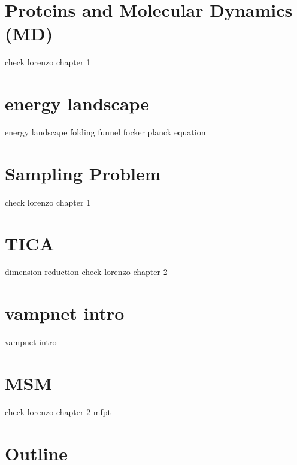 \section{Proteins and Molecular Dynamics (MD)}
\label{sec:MD}
check lorenzo chapter 1


\section{energy landscape }
energy landscape 
folding funnel
focker planck equation
\section{Sampling Problem}
check  lorenzo chapter 1

\section{TICA}
dimension reduction
check  lorenzo chapter 2

\section{vampnet intro}
vampnet intro

\section{MSM}
check  lorenzo chapter 2
mfpt

\section{Outline}